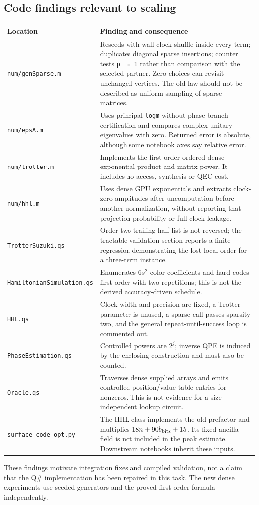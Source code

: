\documentclass[11pt,a4paper]{article}
\begin{document}
\subsection{Code findings relevant to scaling}
\begin{longtable}{p{.32\linewidth}p{.60\linewidth}}
\toprule Location & Finding and consequence \\\midrule\endhead
\texttt{num/genSparse.m} & Reseeds with wall-clock shuffle inside every term; duplicates diagonal sparse insertions; counter tests \texttt{p\ ~=\ 1} rather than comparison with the selected partner. Zero choices can revisit unchanged vertices. The old law should not be described as uniform sampling of sparse matrices.\\[5pt]
\texttt{num/epsA.m} & Uses principal \texttt{logm} without phase-branch certification and compares complex unitary eigenvalues with zero. Returned error is absolute, although some notebook axes say relative error.\\[5pt]
\texttt{num/trotter.m} & Implements the first-order ordered dense exponential product and matrix power. It includes no access, synthesis or QEC cost.\\[5pt]
\texttt{num/hhl.m} & Uses dense GPU exponentials and extracts clock-zero amplitudes after uncomputation before another normalization, without reporting that projection probability or full clock leakage.\\[5pt]
\texttt{TrotterSuzuki.qs} & Order-two trailing half-list is not reversed; the tractable validation section reports a finite regression demonstrating the lost local order for a three-term instance.\\[5pt]
\texttt{HamiltonianSimulation.qs} & Enumerates $6s^2$ color coefficients and hard-codes first order with two repetitions; this is not the derived accuracy-driven schedule.\\[5pt]
\texttt{HHL.qs} & Clock width and precision are fixed, a Trotter parameter is unused, a sparse call passes sparsity two, and the general repeat-until-success loop is commented out.\\[5pt]
\texttt{PhaseEstimation.qs} & Controlled powers are $2^j$; inverse QPE is induced by the enclosing construction and must also be counted.\\[5pt]
\texttt{Oracle.qs} & Traverses dense supplied arrays and emits controlled position/value table entries for nonzeros. This is not evidence for a size-independent lookup circuit.\\[5pt]
\texttt{surface\_code\_opt.py} & The HHL class implements the old prefactor and multiplies $18n+90b_{\rm bits}+15$. Its fixed ancilla field is not included in the peak estimate. Downstream notebooks inherit these inputs.\\
\bottomrule
\end{longtable}
These findings motivate integration fixes and compiled validation, not a claim that the Q\# implementation has been repaired in this task. The new dense experiments use seeded generators and the proved first-order formula independently.
\end{document}
